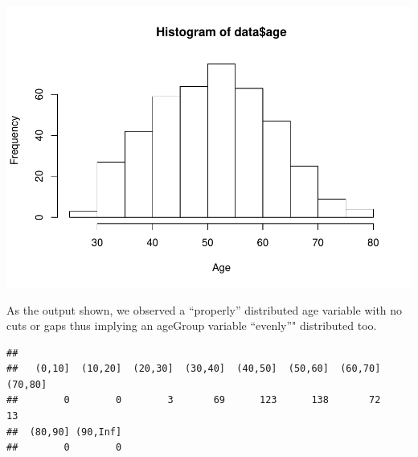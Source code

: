 \documentclass[]{article}
\newenvironment{Shaded}{\begin{snugshade}}{\end{snugshade}}
\newcommand{\KeywordTok}[1]{\textcolor[rgb]{0.13,0.29,0.53}{\textbf{#1}}}
\newcommand{\DataTypeTok}[1]{\textcolor[rgb]{0.13,0.29,0.53}{#1}}
\newcommand{\DecValTok}[1]{\textcolor[rgb]{0.00,0.00,0.81}{#1}}
\newcommand{\StringTok}[1]{\textcolor[rgb]{0.31,0.60,0.02}{#1}}
\newcommand{\OtherTok}[1]{\textcolor[rgb]{0.56,0.35,0.01}{#1}}
\newcommand{\OperatorTok}[1]{\textcolor[rgb]{0.81,0.36,0.00}{\textbf{#1}}}
\newcommand{\NormalTok}[1]{#1}
\begin{document}
\begin{Shaded}
\end{Shaded}

\includegraphics{report_files/figure-latex/unnamed-chunk-4-1.pdf}

As the output shown, we observed a ``properly'' distributed age variable
with no cuts or gaps thus implying an ageGroup variable ``evenly''"
distributed too.

\begin{Shaded}
\end{Shaded}

\begin{verbatim}
## 
##   (0,10]  (10,20]  (20,30]  (30,40]  (40,50]  (50,60]  (60,70]  (70,80] 
##        0        0        3       69      123      138       72       13 
##  (80,90] (90,Inf] 
##        0        0
\end{verbatim}
\end{document}
